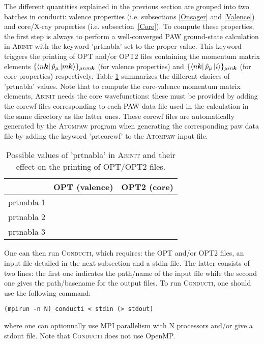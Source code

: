 \documentclass[a4,12pts]{extarticle}
\newcommand{\cmark}{\ding{51}}%
\newcommand{\xmark}{\ding{55}}%
\begin{document}
The different quantities explained in the previous section are grouped into two batches in conducti: valence properties (i.e. subsections \ref{Onsager} and \ref{Valence}) and core/X-ray properties (i.e. subsection~\ref{Core}). 
To compute these properties, the first step is always to perform a well-converged PAW ground-state calculation in \textsc{Abinit} with the keyword 'prtnabla' set to the proper value. This keyword triggers the printing of OPT and/or OPT2 files containing the momentum matrix elements  $\{\bra{n\boldsymbol{k}}\hat{p}_{\mu}\ket{m\boldsymbol{k}}\}_{\mu nm\boldsymbol{k}}$ (for valence properties) and $\{\bra{n\boldsymbol{k}}\hat{p}_{\mu}\ket{i}\}_{\mu in\boldsymbol{k}}$ (for core properties) respectively. Table \ref{table_prtnabla} summarizes the different choices of 'prtnabla' values. Note that to compute the core-valence momentum matrix elements, \textsc{Abinit} needs the core wavefunctions: these must be provided by adding the corewf files  corresponding to each PAW data file used in the calculation in the same directory as the latter ones. These corewf files are automatically generated by the \textsc{Atompaw} \cite{Holzwarth2001} program when generating the corresponding paw data file by adding the keyword 'prtcorewf' to the \textsc{Atompaw} input file.


\begin{table}[h!]
\centering
\begin{tabular}{l| c c} 
\hline
\hline
 & OPT (valence) & OPT2 (core) \\
\hline
prtnabla 1 &\cmark & \xmark\\
prtnabla 2 &\cmark & \cmark\\
prtnabla 3 &\xmark & \cmark\\
\hline
\hline
\end{tabular}
\caption{Possible values of 'prtnabla' in \textsc{Abinit} and their effect on the printing of OPT/OPT2 files.}\label{table_prtnabla}
\end{table}

One can then run \textsc{Conducti}, which requires: the OPT and/or OPT2 files, an input file detailed in the next subsection and a stdin file. The latter consists of two lines: the first one indicates the path/name of the input file while the second one gives the path/basename for the output files. To run \textsc{Conducti}, one should use the following command:
\begin{verbatim}
(mpirun -n N) conducti < stdin (> stdout)
\end{verbatim}
where one can optionnally use MPI parallelism with N processors and/or give a stdout file. Note that \textsc{Conducti} does not use OpenMP.\\
\end{document}
